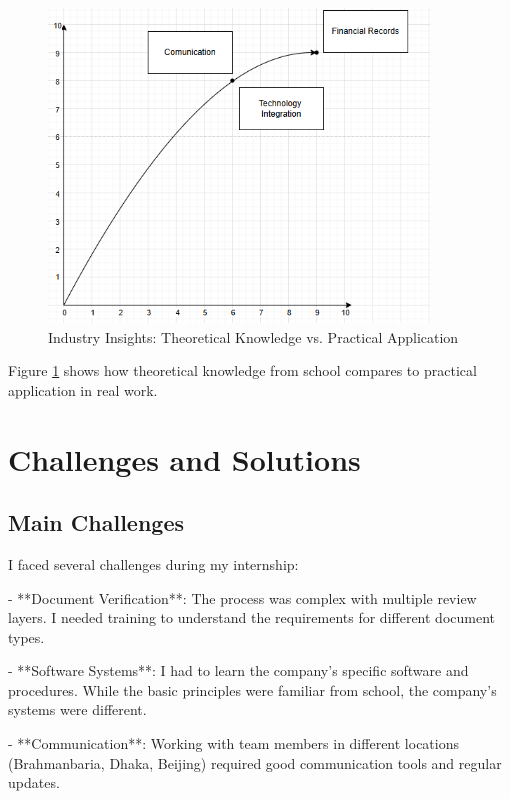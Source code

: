 \begin{figure}[H]
    \centering
    \includegraphics[width=0.9\textwidth]{assets/images/industry_insights_matrix.png}
    \caption{Industry Insights: Theoretical Knowledge vs. Practical Application}
    \label{fig:industry_insights_matrix}
\end{figure}

Figure \ref{fig:industry_insights_matrix} shows how theoretical knowledge from school compares to practical application in real work.

\section{Challenges and Solutions}

\subsection{Main Challenges}
I faced several challenges during my internship:

- **Document Verification**: The process was complex with multiple review layers. I needed training to understand the requirements for different document types.

- **Software Systems**: I had to learn the company's specific software and procedures. While the basic principles were familiar from school, the company's systems were different.

- **Communication**: Working with team members in different locations (Brahmanbaria, Dhaka, Beijing) required good communication tools and regular updates.

